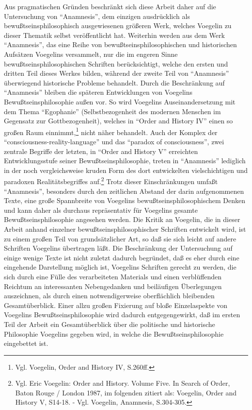 Aus pragmatischen Gründen beschränkt sich diese Arbeit daher auf die
Untersuchung von "`Anamnesis"', dem einzigen ausdrücklich als
bewußtseinsphilosophisch ausgewiesenen größeren Werk, welches Voegelin zu
dieser Thematik selbst veröffentlicht hat. Weiterhin werden aus dem Werk
"`Anamnesis"', das eine Reihe von bewußtseinsphilosophischen und historischen
Aufsätzen Voegelins versammelt, nur die im engeren Sinne
bewußtseinsphilosophischen Schriften berücksichtigt, welche den ersten und
dritten Teil dieses Werkes bilden, während der zweite Teil von
"`Anamnesis"' überwiegend historische Probleme behandelt. Durch die
Beschränkung auf "`Anamnesis"' bleiben die späteren Entwicklungen von
Voegelins Bewußtseinsphilosophie außen vor. So wird Voegelins
Auseinandersetzung mit dem Thema "`Egophanie"' (Selbstbezogenheit des modernen
Menschen im Gegensatz zur Gottbezogenheit), welches in "`Order and History
IV"' einen so großen Raum einnimmt,\footnote{Vgl. Voegelin, Order and History
  IV, S.260ff.} nicht näher behandelt. Auch der Komplex der
"`consciousness-reality-language"' und das "`paradox of consciousness"', zwei
zentrale Begriffe der letzten, in "`Order and History V"' erreichten
Entwicklungsstufe seiner Bewußtseinsphilosophie, treten in "`Anamnesis"'
lediglich in der noch vergleichsweise kruden Form des dort entwickelten
vielschichtigen und paradoxen Realitätsbegriffes auf.\footnote{Vgl. Eric
  Voegelin: Order and History. Volume Five. In Search of Order, Baton Rouge /
  London 1987, im folgenden zitiert als: Voegelin, Order and History V,
  S14-18.  - Vgl. Voegelin, Anamnesis, S.304-305.} Trotz dieser
Einschränkungen umfaßt "`Anamnesis"', besonders durch den zeitlichen Abstand
der darin aufgenommenen Texte, eine große Spannbreite von Voegelins
bewußtseinsphilosophischem Denken und kann daher als durchaus repräsentativ
für Voegelins gesamte Bewußtseinsphilosophie angesehen werden.  Die Kritik an
Voegelin, die in dieser Arbeit anhand einzelner bewußtseinsphilosophischer
Schriften entwickelt wird, ist zu einem großen Teil von grundsätzlicher Art,
so daß sie sich leicht auf andere Schriften Voegelins übertragen läßt. Die
Beschränkung der Untersuchung auf einige wenige Texte ist nicht zuletzt
dadurch begründet, daß es eher durch eine eingehende Darstellung möglich ist,
Voegelins Schriften gerecht zu werden, die sich durch eine Fülle des
verarbeiteten Materials und einen verblüffenden Reichtum an interessanten
Nebengedanken und beiläufigen Überlegungen auszeichnen, als durch einen
notwendigerweise oberflächlich bleibenden Gesamtüberblick. Einer allzu großen
Fixierung auf bloße Einzelaspekte von Voegelins Bewußtseinsphilosophie wird
dadurch entgegengewirkt, daß im ersten Teil der Arbeit ein
Gesamtüberblick über die politische und historische Philosophie Voegelins
gegeben wird, in welche die Bewußtseinsphilosophie eingebettet ist.

